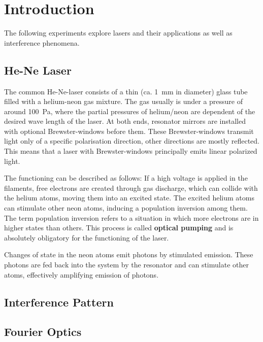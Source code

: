 \chapter{Introduction}
The following experiments explore lasers and their applications as well as interference phenomena.

\section{He-Ne Laser}
The common He-Ne-laser consists of a thin (ca. \SI{1}{\milli\meter} in diameter) glass tube filled with a helium-neon gas mixture.
The gas usually is under a pressure of around \SI{100}{\pascal}, where the partial pressures of helium/neon are dependent of the desired wave length of the laser.
At both ends, resonator mirrors are installed with optional Brewster-windows before them.
These Brewster-windows transmit light only of a specific polarisation direction, other directions are mostly reflected.
This means that a laser with Brewster-windows principally emits linear polarized light.

The functioning can be described as follows:
If a high voltage is applied in the filaments, free electrons are created through gas discharge, which can collide with the helium atoms, moving them into an excited state.
The excited helium atoms can stimulate other neon atoms, inducing a population inversion among them.
The term population inversion refers to a situation in which more electrons are in higher states than others.
This process is called \textbf{optical pumping} and is absolutely obligatory for the functioning of the laser.

Changes of state in the neon atoms emit photons by stimulated emission.
These photons are fed back into the system by the resonator and can stimulate other atoms, effectively amplifying emission of photons.

\section{Interference Pattern}

\section{Fourier Optics}

